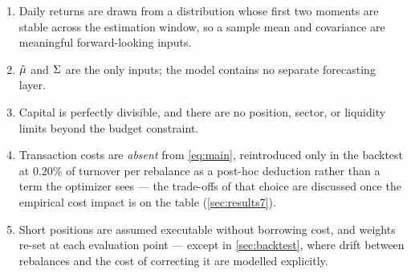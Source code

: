 \begin{enumerate}
  \item Daily returns are drawn from a distribution whose first two moments are stable across the
        estimation window, so a sample mean and covariance are meaningful forward-looking inputs.
  \item $\hat{\mu}$ and $\Sigma$ are the only inputs; the model contains no separate forecasting layer.
  \item Capital is perfectly divisible, and there are no position, sector, or liquidity limits
        beyond the budget constraint.
  \item Transaction costs are \emph{absent} from \cref{eq:main}, reintroduced only in the
        backtest at $0.20\%$ of turnover per rebalance as a post-hoc deduction rather than a term
        the optimizer sees --- the trade-offs of that choice are discussed once the empirical
        cost impact is on the table (\cref{sec:results7}).
  \item Short positions are assumed executable without borrowing cost, and weights re-set at each
        evaluation point --- except in \cref{sec:backtest}, where drift between rebalances and
        the cost of correcting it are modelled explicitly.
\end{enumerate}
